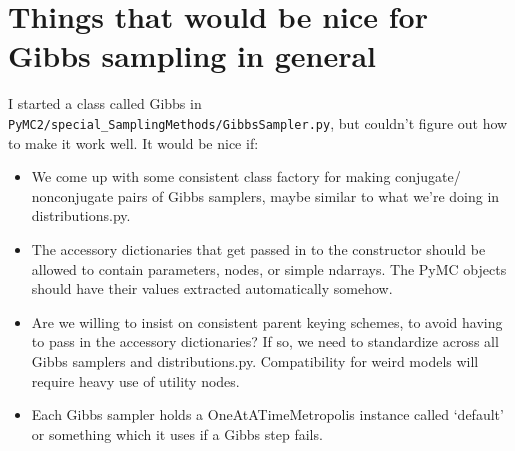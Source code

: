 \documentclass{article}
\begin{document}
\section{Things that would be nice for Gibbs sampling in general}
I started a class called Gibbs in \texttt{PyMC2/special\_SamplingMethods/GibbsSampler.py}, but couldn't figure out how to make it work well. It would be nice if:  
\begin{itemize}
	\item We come up with some consistent class factory for making conjugate/ nonconjugate pairs of Gibbs samplers, maybe similar to what we're doing in distributions.py.	
	\item The accessory dictionaries that get passed in to the constructor should be allowed to contain parameters, nodes, or simple ndarrays. The PyMC objects should have their values extracted automatically somehow.
	\item Are we willing to insist on consistent parent keying schemes, to avoid having to pass in the accessory dictionaries? If so, we need to standardize across all Gibbs samplers and distributions.py. Compatibility for weird models will require heavy use of utility nodes.
	\item Each Gibbs sampler holds a OneAtATimeMetropolis instance called `default' or something which it uses if a Gibbs step fails.
\end{itemize} 
\end{document}
